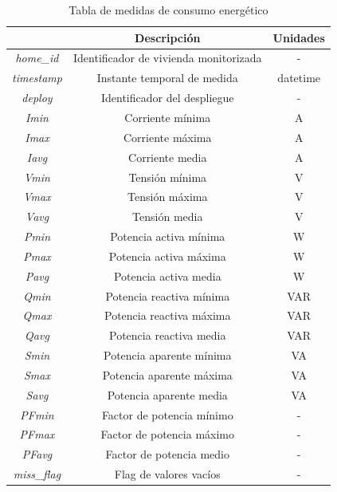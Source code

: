 \begin{table}[h!]
    \centering
    \begin{tabular}{|c|c|c|}
    \hline
    \rowcolor[HTML]{AAAAAA} 
    \multicolumn{1}{|c|}{\cellcolor[HTML]{AAAAAA}Campo} & \multicolumn{1}{c|}{\cellcolor[HTML]{AAAAAA}Descripción} & Unidades \\ \hline
    \textit{home\_id} & Identificador de vivienda monitorizada & - \\ \hline
    \textit{timestamp} & Instante temporal de medida & datetime \\ \hline
    \textit{deploy} & Identificador del despliegue & - \\ \hline
    \textit{Imin} & Corriente mínima & A \\ \hline
    \textit{Imax} & Corriente máxima & A \\ \hline
    \textit{Iavg} & Corriente media & A \\ \hline
    \textit{Vmin} & Tensión mínima & V \\ \hline
    \textit{Vmax} & Tensión máxima & V \\ \hline
    \textit{Vavg} & Tensión media & V \\ \hline
    \textit{Pmin} & Potencia activa mínima & W \\ \hline
    \textit{Pmax} & Potencia activa máxima & W \\ \hline
    \textit{Pavg} & Potencia activa media & W \\ \hline
    \textit{Qmin} & Potencia reactiva mínima & VAR \\ \hline
    \textit{Qmax} & Potencia reactiva máxima & VAR \\ \hline
    \textit{Qavg} & Potencia reactiva media & VAR \\ \hline
    \textit{Smin} & Potencia aparente mínima & VA \\ \hline
    \textit{Smax} & Potencia aparente máxima & VA \\ \hline
    \textit{Savg} & Potencia aparente media & VA \\ \hline
    \textit{PFmin} & Factor de potencia mínimo & - \\ \hline
    \textit{PFmax} & Factor de potencia máximo & - \\ \hline
    \textit{PFavg} & Factor de potencia medio & - \\ \hline
    \textit{miss\_flag} & Flag de valores vacíos & - \\ \hline
    \end{tabular}
    \caption{Tabla de medidas de consumo energético \cite{sustdata}}
    \label{tab:consumo}
\end{table}

